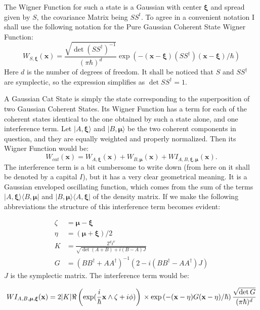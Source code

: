 \documentclass[a4paper,12pt]{article}
\newcommand{\ihb}{\frac{i}{\hbar}}
\newcommand{\xfase}{\mathbf{x}}
\newcommand{\xifase}{ {\boldsymbol{\xi}} }
\newcommand{\mufase}{ {\boldsymbol{\mu}} }
\newcommand{\bra}[1]{\langle #1|}
\newcommand{\ket}[1]{|#1\rangle}
\begin{document}
The Wigner Function for such a state is a Gaussian
with center $\xifase$ and spread given by $S$, the covariance 
Matrix being $SS^t$. To agree in a convenient notation
I shall use the following notation for the 
Pure Gaussian Coherent State Wigner Function:
\begin{equation}
W_{S,\xifase}(\xfase)=\frac{\sqrt{\det (SS^\dagger)^{-1}}}{(\pi\hbar)^d}
\exp(-(\xfase-\xifase)(SS^\dagger)(\xfase-\xifase)/\hbar)
\end{equation}
Here $d$ is the number of degrees of freedom. It shall be noticed
that $S$ and $SS^\dagger$ are symplectic, so the expression simplifies
as $\det SS^\dagger =1$. 

A Gaussian Cat State is simply the state corresponding
to the superposition of two Gaussian Coherent States.
Its Wigner Function has a term for each of the 
coherent states identical to the one obtained by such a state
alone, and one  interference term. Let $\ket{ A, \xifase}$
and $\ket{ B, \mufase}$ be the two coherent components in question,
and they are equally weighted and properly normalized.
Then its Wigner Function would be:
\begin{equation}
W_{cat}(\xfase)=W_{A,\xifase}(\xfase)+W_{B,\mufase}(\xfase)+
WI_{A,B,\xifase,\mufase}(\xfase).
\end{equation}
The interference term is a bit cumbersome to write down (from here on
it shall be denoted by a capital $I$), but it has a 
very clear geometrical meaning. It is a Gaussian enveloped
oscillating function, which comes from the sum of the terms 
$\ket{A,\xifase} \bra{B, \mufase}$ and
$\ket{B,\mufase} \bra{A, \xifase}$ of the density matrix. 
If we make the following abbreviations the structure of this
interference term becomes evident:

\begin{align}
\zeta & = \mufase-\xifase \\
\eta & = (\mufase+\xifase)/2 \\
K & =\frac{2^d i^\nu}{\sqrt{\det(A+B)+i(B-A)J}} \\
G & = (BB^\dagger+AA^\dagger)^{-1}(2-i(BB^\dagger -AA^\dagger)J)
\end{align}
$J$ is the symplectic matrix.
The interference term would be:

\begin{equation}
WI_{A,B,\mufase,\xifase}(\xfase)=
2 |K| \Re \left( \exp (\ihb \xfase \wedge \zeta +i\phi) \right) \\ 
\times \exp\left(-(\xfase-\eta)G(\xfase-\eta)/\hbar \right)
\frac{\sqrt{\det G}}{(\pi\hbar)^d}
\end{equation}
\end{document}
